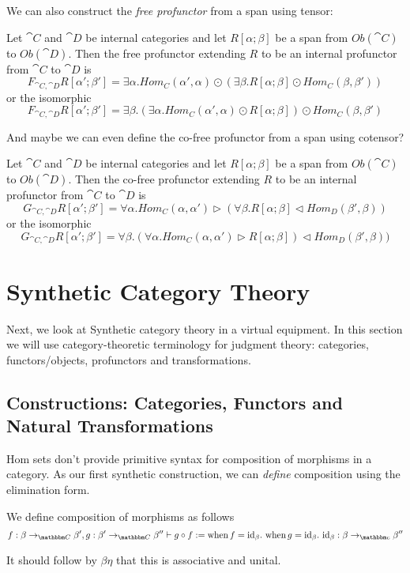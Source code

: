 \documentclass{article}
\begin{document}
We can also construct the \emph{free profunctor} from a span using tensor:

\begin{definition}
  Let $\cat C$ and $\cat D$ be internal categories and let $R[\alpha;\beta]$ be a
  span from $Ob(\cat C)$ to $Ob(\cat D)$. Then the free profunctor
  extending $R$ to be an internal profunctor from $\cat C$ to $\cat D$ is
  \[ F_{\cat C,\cat D}R[\alpha';\beta'] = \exists \alpha. Hom_C(\alpha',\alpha) \odot (\exists \beta. R[\alpha;\beta] \odot Hom_C(\beta,\beta')) \]
  or the isomorphic
  \[ F_{\cat C,\cat D}R[\alpha';\beta'] = \exists \beta. (\exists \alpha. Hom_C(\alpha',\alpha) \odot R[\alpha;\beta]) \odot Hom_C(\beta,\beta') \]
\end{definition}

And maybe we can even define the co-free profunctor from a span using cotensor?
\begin{definition}
  Let $\cat C$ and $\cat D$ be internal categories and let $R[\alpha;\beta]$ be a
  span from $Ob(\cat C)$ to $Ob(\cat D)$. Then the co-free profunctor
  extending $R$ to be an internal profunctor from $\cat C$ to $\cat D$ is
  \[ G_{\cat C,\cat D}R[\alpha';\beta'] =
  \forall \alpha. Hom_C(\alpha,\alpha') \triangleright (\forall \beta. R[\alpha;\beta] \triangleleft Hom_D(\beta',\beta)) \]
  or the isomorphic
  \[ G_{\cat C,\cat D}R[\alpha';\beta'] =
  \forall \beta. 
  (\forall \alpha. Hom_C(\alpha,\alpha') \triangleright R[\alpha;\beta]) \triangleleft Hom_D(\beta',\beta)) \]
\end{definition}

\section{Synthetic Category Theory}

Next, we look at Synthetic category theory in a virtual equipment. In
this section we will use category-theoretic terminology for judgment
theory: categories, functors/objects, profunctors and transformations.

\subsection{Constructions: Categories, Functors and Natural Transformations}

Hom sets don't provide primitive syntax for composition of morphisms
in a category. As our first synthetic construction, we can
\emph{define} composition using the elimination form.
%
\begin{definition}
  We define composition of morphisms as follows
  \[
  f : \beta \to_{\cat C} \beta', g : \beta' \to_{\cat C} \beta'' \vdash g \circ f :=
  \when f = \id_{\beta}.~ \when g = \id_{\beta}.~ \id_{\beta} : \beta \to_{\cat c} \beta''
  \]
\end{definition}
It should follow by $\beta\eta$ that this is associative and unital.
\end{document}
